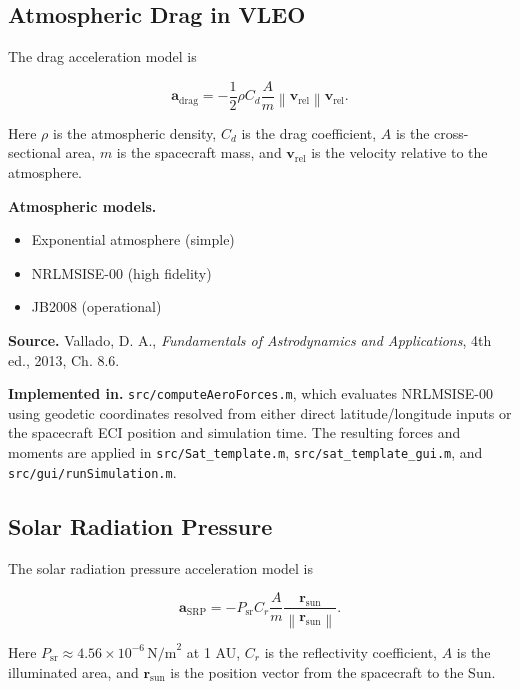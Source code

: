 \documentclass[11pt]{article}
\newcommand{\vect}[1]{\boldsymbol{#1}}
\newcommand{\norm}[1]{\left\lVert #1 \right\rVert}
\begin{document}
\subsection{Atmospheric Drag in VLEO}

The drag acceleration model is

\begin{equation}
\vect{a}_{\mathrm{drag}} = -\frac{1}{2} \rho C_d \frac{A}{m}
\norm{\vect{v}_{\mathrm{rel}}}\vect{v}_{\mathrm{rel}}.
\end{equation}

Here $\rho$ is the atmospheric density, $C_d$ is the drag coefficient,
$A$ is the cross-sectional area, $m$ is the spacecraft mass, and
$\vect{v}_{\mathrm{rel}}$ is the velocity relative to the atmosphere.

\textbf{Atmospheric models.}
\begin{itemize}
\item Exponential atmosphere (simple)
\item NRLMSISE-00 (high fidelity)
\item JB2008 (operational)
\end{itemize}

\textbf{Source.} Vallado, D. A., \emph{Fundamentals of Astrodynamics and
Applications}, 4th ed., 2013, Ch. 8.6.

\textbf{Implemented in.} \texttt{src/computeAeroForces.m}, which evaluates
NRLMSISE-00 using geodetic coordinates resolved from either direct
latitude/longitude inputs or the spacecraft ECI position and simulation
time. The resulting forces and moments are applied in
\texttt{src/Sat\_template.m}, \texttt{src/sat\_template\_gui.m}, and
\texttt{src/gui/runSimulation.m}.

\subsection{Solar Radiation Pressure}

The solar radiation pressure acceleration model is

\begin{equation}
\vect{a}_{\mathrm{SRP}} = -P_{\mathrm{sr}} C_r \frac{A}{m}
\frac{\vect{r}_{\mathrm{sun}}}{\norm{\vect{r}_{\mathrm{sun}}}}.
\end{equation}

Here $P_{\mathrm{sr}} \approx 4.56 \times 10^{-6}\,\mathrm{N/m}^2$ at
1 AU, $C_r$ is the reflectivity coefficient, $A$ is the illuminated area,
and $\vect{r}_{\mathrm{sun}}$ is the position vector from the spacecraft to
the Sun.
\end{document}
